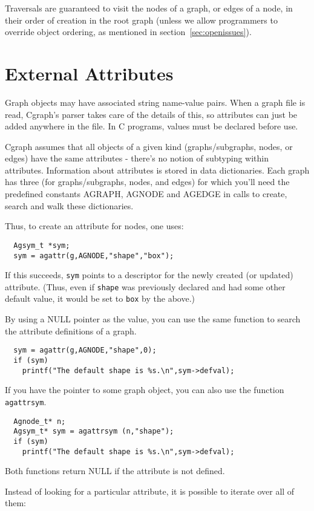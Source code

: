 \documentclass[11pt,letterpaper]{article}
\begin{document}
Traversals are guaranteed to visit the nodes of a graph, or edges of a node,
in their order of creation in the root graph (unless we allow programmers
to override object ordering, as mentioned in section~\ref{sec:openissues}).

\section{External Attributes}
\label{sec:externalattributes}

Graph objects may have associated string name-value pairs.  
When a graph file is read, Cgraph's parser takes care of 
the details of this, so attributes can just be added
anywhere in the file.  In C programs, values must be
declared before use.

Cgraph assumes that all objects of a given kind (graphs/subgraphs,
nodes, or edges) have the same attributes - there's no notion of
subtyping within attributes.   Information about attributes is 
stored in data dictionaries.  Each graph has three (for
graphs/subgraphs, nodes, and edges) for which you'll need the
predefined constants AGRAPH, AGNODE and AGEDGE in
calls to create, search and walk these dictionaries.

Thus, to create an attribute for nodes, one uses:
\begin{verbatim}
  Agsym_t *sym;
  sym = agattr(g,AGNODE,"shape","box");
\end{verbatim}
If this succeeds, \verb"sym" points to a descriptor for the 
newly created (or updated) attribute.  (Thus, even if \verb"shape"
was previously declared and had some other default value,
it would be set to \verb"box" by the above.)

By using a NULL pointer as the value,
you can use the same function to search the attribute definitions of a graph.
\begin{verbatim}
  sym = agattr(g,AGNODE,"shape",0);
  if (sym) 
    printf("The default shape is %s.\n",sym->defval);
\end{verbatim}
If you have the pointer to some graph object, you can also use the function
\verb"agattrsym".  
\begin{verbatim}
  Agnode_t* n;
  Agsym_t* sym = agattrsym (n,"shape");
  if (sym) 
    printf("The default shape is %s.\n",sym->defval);
\end{verbatim}
Both functions return NULL if the attribute is not defined.

Instead of looking for a particular attribute, it is possible to
iterate over all of them:
\end{document}
